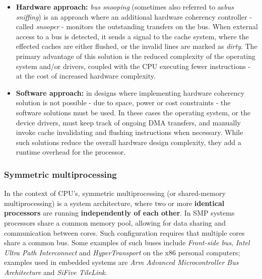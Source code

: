 \begin{itemize}
	\item \textbf{Hardware approach:} \textit{bus snooping} (sometimes also referred to as\textit{bus sniffing}) is an %
		approach where an additional hardware coherency controller - called \textit{snooper} - monitors the outstanding
		transfers on the bus. When external access to a bus is detected, it sends a signal to the cache system, where the
		effected caches are either flushed, or the invalid lines are marked as \textit{dirty}. The primary advantage of this solution is the reduced
		complexity of the operating system and/or drivers, coupled with the CPU executing fewer instructions - at the cost of increased hardware complexity. %
	\item \textbf{Software approach:} in designs where implementing hardware coherency solution is not possible - due to space, power or cost constraints -
		the software solutions must be used. In these cases the operating system, or the device drivers, must keep track of ongoing DMA transfers, and manually
		invoke cache invalidating and flushing instructions when necessary. While such solutions reduce the overall hardware design complexity, they add a
		runtime overhead for the processor.
\end{itemize}


\subsubsection{Symmetric multiprocessing}

In the context of CPU's, symmetric multiprocessing (or shared-memory multiprocessing) is a system architecture, where two or more \textbf{identical processors} %
are running \textbf{independently of each other}. In SMP systems processors share a common memory pool, allowing for data sharing and communication
between cores. Such configuration requires that multiple cores share a common bus. Some examples of such buses include \textit{Front-side bus}, \textit{Intel Ultra Path Interconnect} %
and \textit{HyperTransport} on the x86 personal computers; examples used in embedded systems are \textit{Arm Advanced Microcontroller Bus Architecture} and \textit{SiFive TileLink}. %

